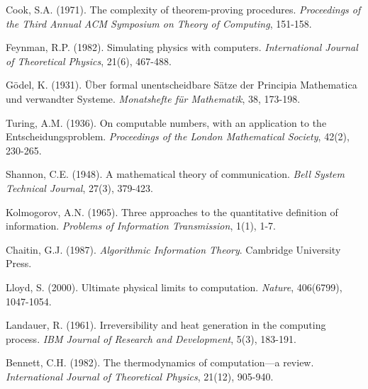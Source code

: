 \documentclass[11pt]{article}
\begin{document}

\begin{thebibliography}{99}

Cook, S.A. (1971). The complexity of theorem-proving procedures. \textit{Proceedings of the Third Annual ACM Symposium on Theory of Computing}, 151-158.

Feynman, R.P. (1982). Simulating physics with computers. \textit{International Journal of Theoretical Physics}, 21(6), 467-488.

Gödel, K. (1931). Über formal unentscheidbare Sätze der Principia Mathematica und verwandter Systeme. \textit{Monatshefte für Mathematik}, 38, 173-198.

Turing, A.M. (1936). On computable numbers, with an application to the Entscheidungsproblem. \textit{Proceedings of the London Mathematical Society}, 42(2), 230-265.

Shannon, C.E. (1948). A mathematical theory of communication. \textit{Bell System Technical Journal}, 27(3), 379-423.

Kolmogorov, A.N. (1965). Three approaches to the quantitative definition of information. \textit{Problems of Information Transmission}, 1(1), 1-7.

Chaitin, G.J. (1987). \textit{Algorithmic Information Theory}. Cambridge University Press.

Lloyd, S. (2000). Ultimate physical limits to computation. \textit{Nature}, 406(6799), 1047-1054.

Landauer, R. (1961). Irreversibility and heat generation in the computing process. \textit{IBM Journal of Research and Development}, 5(3), 183-191.

Bennett, C.H. (1982). The thermodynamics of computation—a review. \textit{International Journal of Theoretical Physics}, 21(12), 905-940.

\end{thebibliography}
\end{document}
